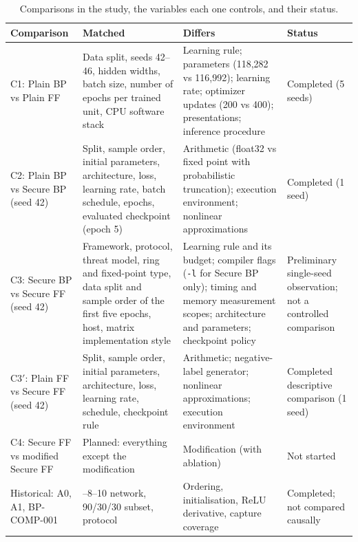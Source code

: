 \begin{table}[ht]
\centering
\small
\begin{tabular}{@{}>{\raggedright\arraybackslash}p{2.6cm}>{\raggedright\arraybackslash}p{4.4cm}>{\raggedright\arraybackslash}p{4.3cm}>{\raggedright\arraybackslash}p{2.4cm}@{}}
\toprule
Comparison & Matched & Differs & Status \\
\midrule
C1: Plain BP vs Plain FF & Data split, seeds 42--46, hidden widths, batch size, number of epochs per trained unit, CPU software stack & Learning rule; parameters (118{,}282 vs 116{,}992); learning rate; optimizer updates (200 vs 400); presentations; inference procedure & Completed (5 seeds) \\
C2: Plain BP vs Secure BP (seed 42) & Split, sample order, initial parameters, architecture, loss, learning rate, batch schedule, epochs, evaluated checkpoint (epoch 5) & Arithmetic (float32 vs fixed point with probabilistic truncation); execution environment; nonlinear approximations & Completed (1 seed) \\
C3: Secure BP vs Secure FF (seed 42) & Framework, protocol, threat model, ring and fixed-point type, data split and sample order of the first five epochs, host, matrix implementation style & Learning rule and its budget; compiler flags (\texttt{-l} for Secure BP only); timing and memory measurement scopes; architecture and parameters; checkpoint policy & Preliminary single-seed observation; not a controlled comparison \\
C3$'$: Plain FF vs Secure FF (seed 42) & Split, sample order, initial parameters, architecture, loss, learning rate, schedule, checkpoint rule & Arithmetic; negative-label generator; nonlinear approximations; execution environment & Completed descriptive comparison (1 seed) \\
C4: Secure FF vs modified Secure FF & Planned: everything except the modification & Modification (with ablation) & Not started \\
Historical: A0, A1, BP-COMP-001 & 784--8--10 network, 90/30/30 subset, protocol & Ordering, initialisation, ReLU derivative, capture coverage & Completed; not compared causally \\
\bottomrule
\end{tabular}
\caption{Comparisons in the study, the variables each one controls, and their status.}
\label{tab:method-comparisons}
\end{table}

